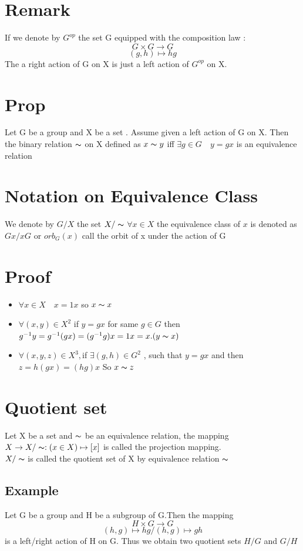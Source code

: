 \documentclass{book}
\begin{document}
\section{Remark}
If we denote by $G^{op}$ the set G equipped with the composition law :$$G\times G\rightarrow G$$$$(g,h)\mapsto hg$$
The a right action of G on X is just a left action of $G^{op}$ on X.
\section{Prop}
Let G be a group and X be a set . Assume given a left action of G on X. Then the binary relation $\thicksim$ on X defined as $x\thicksim y$ iff $\exists g\in G\quad y=gx$ is an equivalence relation
\section{Notation on Equivalence Class}
We denote by $G/X$ the set $X/\thicksim $ $\forall x\in X$ the equivalence class of $x$ is denoted as $Gx/xG$ or $orb_G(x)$ call the orbit of x under the action of G

\section{Proof}
\begin{itemize}
    \item $\forall x\in X\quad x=1x$ so $x\thicksim x$
    \item $\forall (x,y)\in X^2$ if $y=gx$ for same $g\in G$ then $g^{-1}y=g^{-1}(gx)=(g^{-1}g)x=1x=x.(y\thicksim x)$
    \item $\forall(x,y,z)\in X^3,$if $\exists(g,h)\in G^2$ , such that $y=gx$ and then $z=h(gx)=(hg)x$ So $x\thicksim z$
\end{itemize}
\section{Quotient set}
Let X be a set and $\thicksim $ be an equivalence relation, the mapping $X\rightarrow X/\thicksim : (x\in X)\mapsto[x]$ is called the projection mapping.\\$X/\thicksim  $ is called the quotient set of X by equivalence relation $\thicksim $
\subsection{Example}
Let G be a group and H be a subgroup of G.Then the mapping $$H\times G\rightarrow G$$$$(h,g)\mapsto hg/(h,g)\mapsto gh$$
is a left/right action of H on G. Thus we obtain         two quotient sets $H/ G$ and $G/ H$
\end{document}
